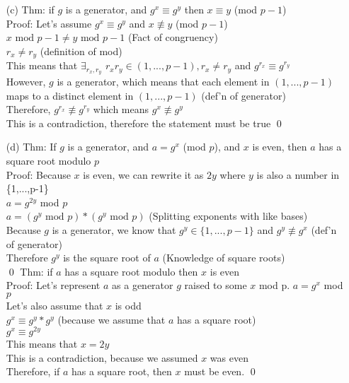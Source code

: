 \documentclass[11pt]{article}
\theoremstyle{definition}
\begin{document}
\begin{enumerate}
	\item[(c)]
	Thm: if $g$ is a generator, and $g^x \equiv g^y$ then $x \equiv y$ (mod $p-1$)\\
	\newline
	Proof: Let's assume $g^x \equiv g^y$ and $x \not\equiv y$ (mod $p-1$)\\
	$x \text{ mod } p-1 \neq y \text{ mod } p-1$ (Fact of congruency)\\
	$r_x \neq r_y$ (definition of mod)\\
	This means that $\exists_{r_x,r_y}$ $r_xr_y \in (1,...,p-1), r_x \neq r_y$ and $g^{r_x} \equiv g^{r_y}$\\
	However, $g$ is a generator, which means that each element in $(1,...,p-1)$ maps to a distinct element in $(1,...,p-1)$ (def'n of generator)\\
	Therefore, $g^{r_x} \not\equiv g^{r_y}$ which means $g^x \not\equiv g^y$\\
	This is a contradiction, therefore the statement must be true
	\qed

	\item[(d)]
	Thm: If $g$ is a generator, and $a = g^x$ (mod $p$), and $x$ is even, then $a$ has a square root modulo $p$\\
	\newline
	Proof: Because $x$ is even, we can rewrite it as $2y$ where $y$ is also a number in \{1,...,p-1\}\\
	$a = g^{2y}$ mod $p$\\
	$a = (g^y \text{ mod } p) * (g^y \text{ mod } p)$ (Splitting exponents with like bases)\\
	Because $g$ is a generator, we know that $g^y \in \{1,...,p-1\}$ and $g^y \not\equiv g^x$ (def'n of generator)\\
	Therefore $g^y$ is the square root of $a$ (Knowledge of square roots)\\
	\qed
	\newline
	Thm: if $a$ has a square root modulo then $x$ is even\\
	\newline
	Proof: Let's represent $a$ as a generator $g$ raised to some $x$ mod p.  $a = g^x$ mod $p$\\
	Let's also assume that $x$ is odd\\
	$g^x \equiv g^y * g^y$ (because we assume that $a$ has a square root)\\
	$g^x \equiv g^{2y}$\\
	This means that $x = 2y$\\
	This is a contradiction, because we assumed $x$ was even\\
	Therefore, if $a$ has a square root, then $x$ must be even.
	\qed


\end{enumerate}
\end{document}
